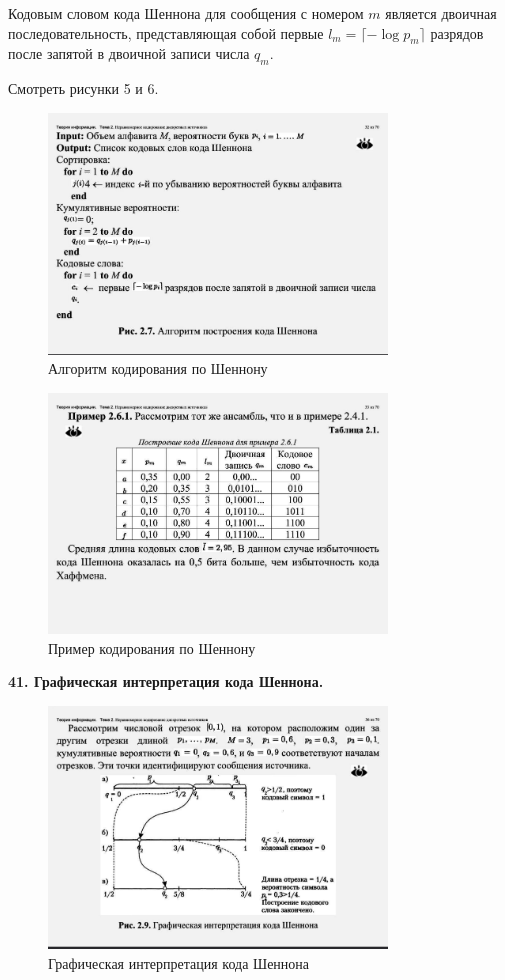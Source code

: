 \documentclass[14pt]{article}
\begin{document}
Кодовым словом кода Шеннона для сообщения с номером \(m\) является двоичная последовательность, представляющая собой первые \(l_m = \lceil -\log p_m \rceil\) разрядов после запятой в двоичной записи числа \(q_m\).

Смотреть рисунки 5 и 6.

\begin{figure}[hp]
\centering
    \includegraphics[width=90mm]{shennon_alg.png}
\caption{Алгоритм кодирования по Шеннону}
\end{figure}

\begin{figure}[hp]
\centering
    \includegraphics[width=90mm]{shennon_example.png}
\caption{Пример кодирования по Шеннону}
\end{figure}


\bigskip
\textbf{41. Графическая интерпретация кода Шеннона.} \\

\begin{figure}[hp]
\centering
    \includegraphics[width=90mm]{shennon_inter.png}
\caption{Графическая интерпретация кода Шеннона}
\end{figure}
\end{document}

